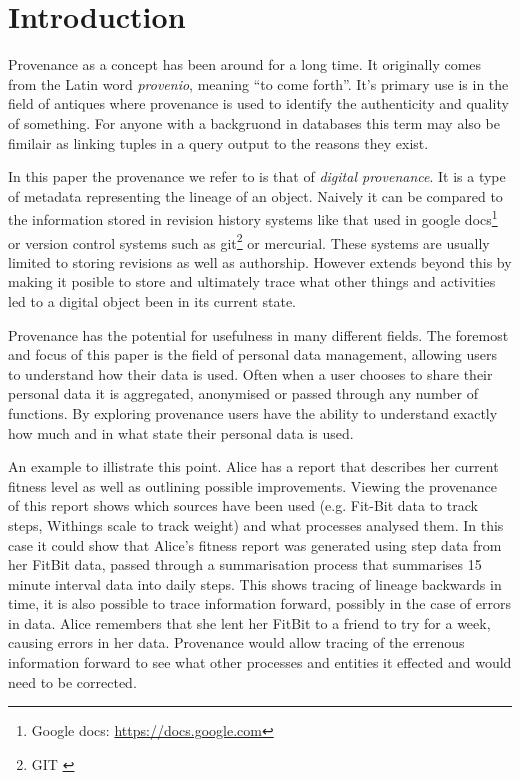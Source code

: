 \chapter{Introduction}

Provenance as a concept has been around for a long time. It originally comes from the Latin word \textit{provenio}, meaning ``to come forth''. It's primary use is in the field of antiques where provenance is used to identify the authenticity and quality of something. For anyone with a backgruond in databases this term may also be fimilair as linking tuples in a query output to the reasons they exist.

In this paper the provenance we refer to is that of \textit{digital provenance}. It is a type of metadata representing the lineage of an object. Naively it can be compared to the information stored in revision history systems like that used in google docs\footnote{Google docs: \url{https://docs.google.com}} or version control
systems such as git\footnote{GIT\: \url{}} or mercurial. These systems are usually limited to storing revisions as well as authorship. However extends beyond this by making it posible to store and ultimately trace what other things and activities led to a digital object been in its current state.

Provenance has the potential for usefulness in many different fields. The foremost and focus of this paper is the field of personal data management, allowing users to understand how their data is used. Often when a user chooses to share their personal data it is aggregated, anonymised or passed through any number of functions. By exploring provenance users have the ability to understand exactly how much and in what state their personal data is used.

An example to illistrate this point. Alice has a report that describes her current fitness level as well as outlining possible improvements. Viewing the provenance of
this report shows which sources have been used (e.g. Fit-Bit data to track steps, Withings scale to track weight) and what processes analysed them. In this case it could show that Alice's fitness report was generated using step data from her FitBit data, passed through a summarisation process that summarises 15 minute interval data into daily steps. This shows tracing of lineage backwards in time, it is also possible to trace information forward, possibly in the case of errors in data. Alice remembers that she lent her FitBit to a friend to try for a week, causing errors in her data. Provenance would allow tracing of the errenous information forward to see what other processes and entities it effected and would need to be corrected.

